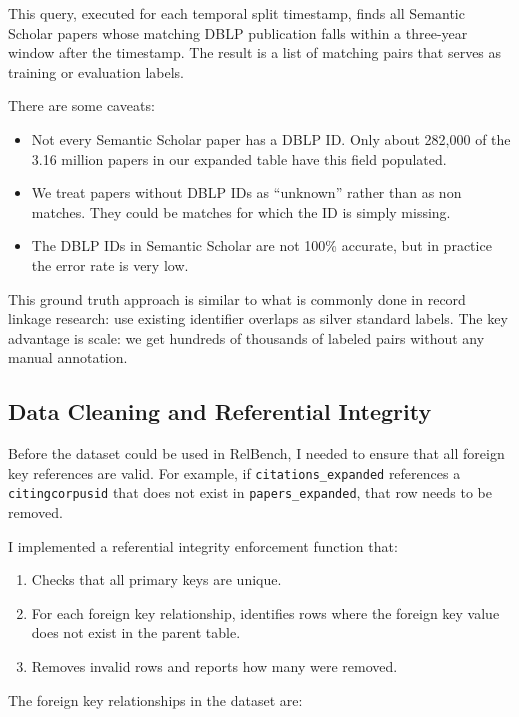 \documentclass{article}
\begin{document}
This query, executed for each temporal split timestamp, finds all Semantic Scholar papers whose matching DBLP publication falls within a three-year window after the timestamp.
The result is a list of matching pairs that serves as training or evaluation labels.

There are some caveats:
\begin{itemize}
    \item Not every Semantic Scholar paper has a DBLP ID. Only about 282,000 of the 3.16 million papers in our expanded table have this field populated.
    \item We treat papers without DBLP IDs as ``unknown'' rather than as non matches. They could be matches for which the ID is simply missing.
    \item The DBLP IDs in Semantic Scholar are not 100\% accurate, but in practice the error rate is very low.
\end{itemize}

This ground truth approach is similar to what is commonly done in record linkage research: use existing identifier overlaps as silver standard labels.
The key advantage is scale: we get hundreds of thousands of labeled pairs without any manual annotation.


\subsection{Data Cleaning and Referential Integrity}

Before the dataset could be used in RelBench, I needed to ensure that all foreign key references are valid.
For example, if \texttt{citations\_expanded} references a \texttt{citingcorpusid} that does not exist in \texttt{papers\_expanded}, that row needs to be removed.

I implemented a referential integrity enforcement function that:
\begin{enumerate}
    \item Checks that all primary keys are unique.
    \item For each foreign key relationship, identifies rows where the foreign key value does not exist in the parent table.
    \item Removes invalid rows and reports how many were removed.
\end{enumerate}

The foreign key relationships in the dataset are:
\end{document}
